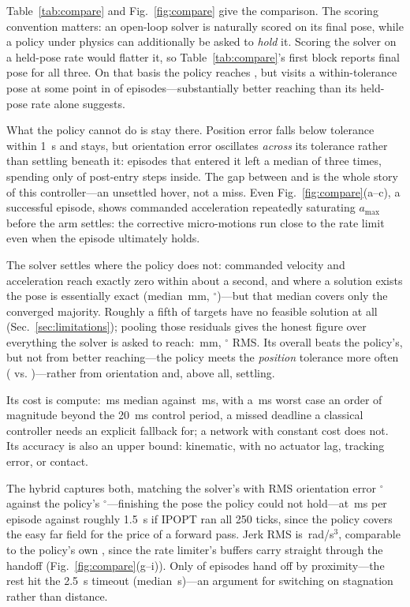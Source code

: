 \documentclass[conference,a4paper]{IEEEtran}
\begin{document}
Table~\ref{tab:compare} and Fig.~\ref{fig:compare} give the comparison. The
scoring convention matters: an open-loop solver is naturally scored on its
final pose, while a policy under physics can additionally be asked to
\emph{hold} it. Scoring the solver on a held-pose rate would flatter it, so
Table~\ref{tab:compare}'s first block reports final pose for all three. On
that basis the policy reaches \RESfinalpose{}, but visits a within-tolerance
pose at some point in \RESbestpose{} of episodes---substantially better
reaching than its held-pose rate alone suggests.

What the policy cannot do is stay there. Position error falls below
tolerance within \SI{1}{\second} and stays, but orientation error oscillates
\emph{across} its tolerance rather than settling beneath it: episodes that
entered it left a median of three times, spending only \RESfracintol{} of
post-entry steps inside. The gap between \RESbestpose{} and \RESfinalpose{}
is the whole story of this controller---an unsettled hover, not a miss. Even
Fig.~\ref{fig:compare}(a--c), a successful episode, shows commanded
acceleration repeatedly saturating $a_{\max}$ before the arm settles: the
corrective micro-motions run close to the rate limit even when the episode
ultimately holds.

The solver settles where the policy does not: commanded velocity and
acceleration reach exactly zero within about a second, and where a solution
exists the pose is essentially exact (median \CASposMedian{}\,mm,
\CASoriMedian{}$^\circ$)---but that median covers only the converged
majority. Roughly a fifth of targets have no feasible solution at all
(Sec.~\ref{sec:limitations}); pooling those residuals gives the honest
figure over everything the solver is asked to reach: \CASposRMS{}\,mm,
\CASoriRMS{}$^\circ$ RMS. Its overall \CASfeasible{} beats the policy's, but
not from better reaching---the policy meets the \emph{position} tolerance
more often (\RESposonly{} vs. \CASposfeasible{})---rather from orientation
and, above all, settling.

Its cost is compute: \CASsolveMed{}\,ms median against \RLforward{}\,ms,
with a \CASsolveMax{}\,ms worst case an order of magnitude beyond the
\SI{20}{\milli\second} control period, a missed deadline a classical
controller needs an explicit fallback for; a network with constant cost
does not. Its accuracy is also an upper bound: kinematic, with no actuator
lag, tracking error, or contact.

The hybrid captures both, matching the solver's \HYBsuccess{} with RMS
orientation error \HYBtheta{}$^\circ$ against the policy's
\RESthetafinal{}$^\circ$---finishing the pose the policy could not hold---at
\HYBcompute{}\,ms per episode against roughly \SI{1.5}{\second} if IPOPT ran
all 250 ticks, since the policy covers the easy far field for the price of a
forward pass. Jerk RMS is \HYBjerk{}\,rad/s$^3$, comparable to the policy's
own \RESjerkOn{}, since the rate limiter's buffers carry straight through
the handoff (Fig.~\ref{fig:compare}(g--i)). Only \HYBbyprox{} of episodes
hand off by proximity---the rest hit the \SI{2.5}{\second} timeout (median
\HYBhandoff{}\,s)---an argument for switching on stagnation rather than
distance.
\end{document}
